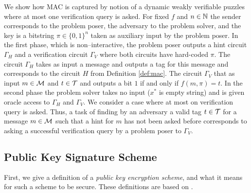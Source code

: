We show how MAC is captured by notion of a dynamic weakly verifiable puzzles where at most one verification query is asked.
For fixed $f$ and $n \in \mathbb{N}$ the sender corresponds to the problem poser, the adversary to the problem solver,
and the key is a bitstring $\pi \in \{0,1\}^{n}$ taken as auxiliary input by the problem poser.
In the first phase, which is non--interactive, the problem poser outputs a hint circuit
$\Gamma_H$ and a verification circuit $\Gamma_V$ where both circuits have hard-coded $\pi$.
The circuit $\Gamma_H$ takes as input a message and outputs a tag for this message and corresponds to the circuit $H$ from Definition \ref{def:mac}.
The circuit $\Gamma_V$ that as input $m \in \mathcal{M}$ and $t \in \mathcal{T}$ and outputs a bit $1$ if and only if $f(m, \pi) = t$.
In the second phase the problem solver takes no input ($x^*$ is empty string) and is given oracle access to $\Gamma_H$ and $\Gamma_V$.
We consider a case where at most on verification query is asked.
Thus, a task of finding by an adversary a valid tag $t \in \mathcal{T}$ for a message $m \in \mathcal{M}$ such that a hint for $m$ has not been asked before
corresponds to asking a successful verification query by a problem poser to $\Gamma_V$.
%
\subsection{Public Key Signature Scheme}
First, we give a definition of a \textit{public key encryption scheme}, and what it means for such a scheme to be secure.
These definitions are based on \cite{Goldreich:2004:FCV:975541}.

